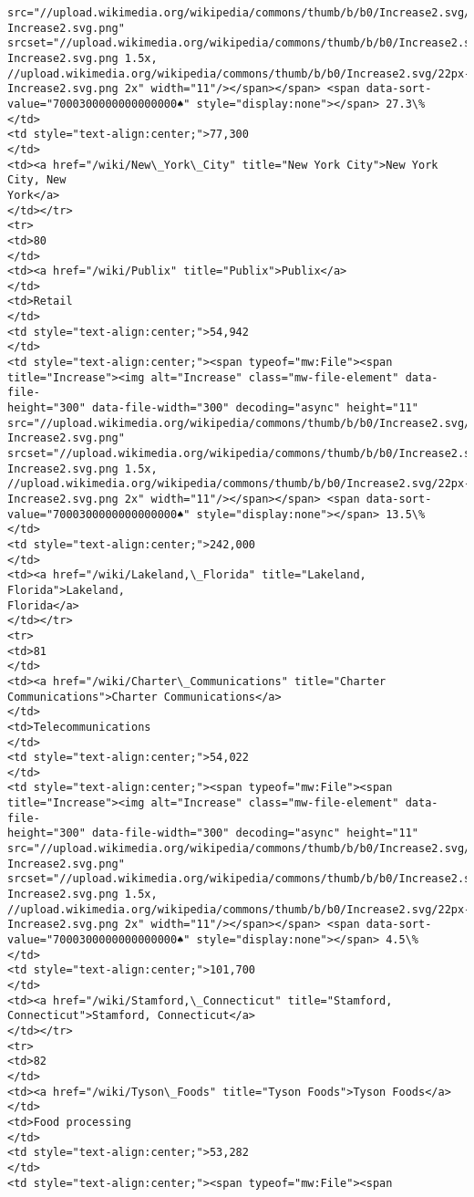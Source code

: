 \documentclass[11pt]{article}
\begin{document}
\begin{Verbatim}[commandchars=\\\{\}]
src="//upload.wikimedia.org/wikipedia/commons/thumb/b/b0/Increase2.svg/11px-
Increase2.svg.png"
srcset="//upload.wikimedia.org/wikipedia/commons/thumb/b/b0/Increase2.svg/17px-
Increase2.svg.png 1.5x,
//upload.wikimedia.org/wikipedia/commons/thumb/b/b0/Increase2.svg/22px-
Increase2.svg.png 2x" width="11"/></span></span> <span data-sort-
value="7000300000000000000♠" style="display:none"></span> 27.3\%
</td>
<td style="text-align:center;">77,300
</td>
<td><a href="/wiki/New\_York\_City" title="New York City">New York City, New
York</a>
</td></tr>
<tr>
<td>80
</td>
<td><a href="/wiki/Publix" title="Publix">Publix</a>
</td>
<td>Retail
</td>
<td style="text-align:center;">54,942
</td>
<td style="text-align:center;"><span typeof="mw:File"><span
title="Increase"><img alt="Increase" class="mw-file-element" data-file-
height="300" data-file-width="300" decoding="async" height="11"
src="//upload.wikimedia.org/wikipedia/commons/thumb/b/b0/Increase2.svg/11px-
Increase2.svg.png"
srcset="//upload.wikimedia.org/wikipedia/commons/thumb/b/b0/Increase2.svg/17px-
Increase2.svg.png 1.5x,
//upload.wikimedia.org/wikipedia/commons/thumb/b/b0/Increase2.svg/22px-
Increase2.svg.png 2x" width="11"/></span></span> <span data-sort-
value="7000300000000000000♠" style="display:none"></span> 13.5\%
</td>
<td style="text-align:center;">242,000
</td>
<td><a href="/wiki/Lakeland,\_Florida" title="Lakeland, Florida">Lakeland,
Florida</a>
</td></tr>
<tr>
<td>81
</td>
<td><a href="/wiki/Charter\_Communications" title="Charter
Communications">Charter Communications</a>
</td>
<td>Telecommunications
</td>
<td style="text-align:center;">54,022
</td>
<td style="text-align:center;"><span typeof="mw:File"><span
title="Increase"><img alt="Increase" class="mw-file-element" data-file-
height="300" data-file-width="300" decoding="async" height="11"
src="//upload.wikimedia.org/wikipedia/commons/thumb/b/b0/Increase2.svg/11px-
Increase2.svg.png"
srcset="//upload.wikimedia.org/wikipedia/commons/thumb/b/b0/Increase2.svg/17px-
Increase2.svg.png 1.5x,
//upload.wikimedia.org/wikipedia/commons/thumb/b/b0/Increase2.svg/22px-
Increase2.svg.png 2x" width="11"/></span></span> <span data-sort-
value="7000300000000000000♠" style="display:none"></span> 4.5\%
</td>
<td style="text-align:center;">101,700
</td>
<td><a href="/wiki/Stamford,\_Connecticut" title="Stamford,
Connecticut">Stamford, Connecticut</a>
</td></tr>
<tr>
<td>82
</td>
<td><a href="/wiki/Tyson\_Foods" title="Tyson Foods">Tyson Foods</a>
</td>
<td>Food processing
</td>
<td style="text-align:center;">53,282
</td>
<td style="text-align:center;"><span typeof="mw:File"><span

\end{Verbatim}
\end{document}

